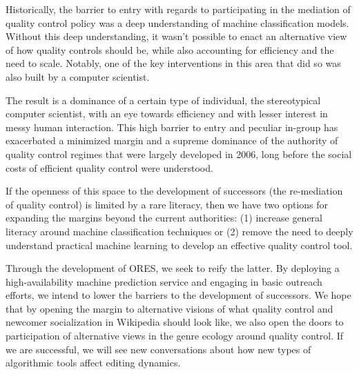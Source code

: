 Historically, the barrier to entry with regards to participating in the mediation of quality control policy was a deep understanding of machine classification models.  Without this deep understanding, it wasn't possible to enact an alternative view of how quality controls should be, while also accounting for efficiency and the need to scale.  Notably, one of the key interventions in this area that did so was also built by a computer scientist\cite{halfaker2014snuggle}.

The result is a dominance of a certain type of individual, the stereotypical computer scientist, with an eye towards efficiency and with lesser interest in messy human interaction.  This high barrier to entry and peculiar in-group has exacerbated a minimized margin and a supreme dominance of the authority of quality control regimes that were largely developed in 2006, long before the social costs of efficient quality control were understood.

If the openness of this space to the development of successors (the re-mediation of quality control) is limited by a rare literacy, then we have two options for expanding the margins beyond the current authorities: (1) increase general literacy around machine classification techniques or (2) remove the need to deeply understand practical machine learning to develop an effective quality control tool.

Through the development of ORES, we seek to reify the latter.  By deploying a high-availability machine prediction service and engaging in basic outreach efforts, we intend to lower the barriers to the development of successors.  We hope that by opening the margin to alternative visions of what quality control and newcomer socialization in Wikipedia should look like, we also open the doors to participation of alternative views in the genre ecology around quality control.  If we are successful, we will see new conversations about how new types of algorithmic tools affect editing dynamics.
